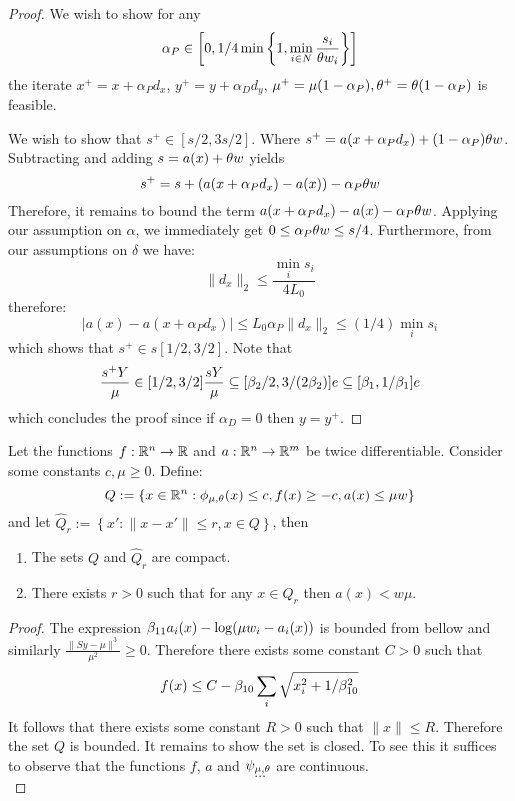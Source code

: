\documentclass{article}
\begin{document}
\begin{proof}
We wish to show for any
$$
\alpha_{P} \in \left[ 0, 1/4 \min \left\{ 1, \min_{i \in \nonzeroSet}{ \frac{s_{i}}{\vioVar \conWeight_i} }  \right\} \right] %
$$
the iterate $x^{+} = x + \alpha_{P} d_{x}$, $y^{+} = y + \alpha_{D} d_{y}$, $\mu^{+} = \mu (1 - \alpha_{P} ), \theta^{+} = \theta ( 1 - \alpha_{P})$ is feasible. 

We wish to show that $ s^{+}  \in [s / 2, 3 s / 2]$. Where $s^{+} = a(x + \alpha_{P} d_{x}) + (1 - \alpha_{P} ) \theta w$. Subtracting and adding $s = a(x) + \theta w$ yields
$$
s^{+} = s + ( a(x + \alpha_{P} d_{x} ) - a(x)) - \alpha_{P} \theta w
$$
Therefore, it remains to bound the term $a(x + \alpha_{P} d_{x}) - a(x)  -  \alpha_{P} \theta w$. Applying our assumption on $\alpha$, we immediately get $0 \le \alpha_P \theta w  \le s / 4$. Furthermore, from our assumptions on $\delta$ we have:
$$
\| d_{x} \|_{2} \le \frac{\min_{i}{s_i}}{4 L_{0}}
$$ 
therefore:
$$
| a(x) - a(x + \alpha_{P} d_{x}) |  \le L_{0} \alpha_{P} \| d_{x} \|_{2} \le (1/4) \min_{i}{ s_{i} }
$$
which shows that $s^{+} \in s [1/2, 3/2]$. Note that
$$
\frac{s^{+} Y}{\mu} \in [1/2, 3/2]  \frac{s Y}{\mu} \subseteq [\beta_{2}/2 , 3/(2 \beta_{2})]  e \subseteq  [\beta_{1}, 1/\beta_{1} ] e
$$
which concludes the proof since if $\alpha_{D} = 0$ then $y = y^{+}$. 
\end{proof}

\begin{lemma}\label{lem:compact-Q}
Let the functions $f : \mathbb{R}^{n} \rightarrow \mathbb{R}$ and $a : \mathbb{R}^{n} \rightarrow \mathbb{R}^{m}$ be twice differentiable.
Consider some constants $c, \mu \ge 0$. Define:
$$
Q :=  \left\{  x \in \mathbb{R}^{n} : \phi_{\mu,\theta}(x) \le c, f(x) \ge -c, a(x) \le \mu w \right\}
$$
and let $\hat{Q}_{r} :=  \left\{  x': \| x - x'\| \le r, x \in Q \right\}$, then
\begin{enumerate}
\item The sets $Q$ and $\hat{Q}_{r}$ are compact.
\item There exists $r > 0$ such that for any $x \in \hat{Q}_{r}$ then $a(x) < w \mu$.
\end{enumerate}
\end{lemma}
\begin{proof}
The expression $\beta_{11} a_i(x) - \log(\mu w_i - a_i(x))$ is bounded from bellow and similarly $\frac{\| S y - \mu \|^3}{\mu^2} \ge 0$. Therefore there exists some constant $C > 0$ such that
$$
f(x) \le C - \beta_{10} \sum_{i}{\sqrt{x_i^2 + 1 / \beta_{10}^2}}
$$
It follows that there exists some constant $R > 0$ such that $\| x \| \le R$. Therefore the set $Q$ is bounded. It remains to show the set is closed. To see this it suffices to observe that the functions $f$, $a$ and $\psi_{\mu,\theta}$ are continuous.
$$
\dots
$$
\end{proof}
\end{document}
